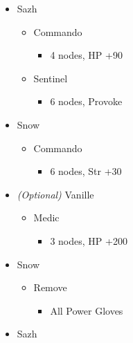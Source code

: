 	\begin{menu}
		\begin{itemize}
			\crystarium
			\begin{itemize}
				\item Sazh
				      \begin{itemize}
					      \item Commando
					            \begin{itemize}
						            \item 4 nodes, HP +90
					            \end{itemize}
					      \item Sentinel
					            \begin{itemize}
						            \item 6 nodes, Provoke
					            \end{itemize}
				      \end{itemize}
				\item Snow
				      \begin{itemize}
					      \item Commando
					            \begin{itemize}
						            \item 6 nodes, Str +30
					            \end{itemize}
				      \end{itemize}
				\item \textit{(Optional)} Vanille
				      \begin{itemize}
					      \item Medic
					            \begin{itemize}
						            \item 3 nodes, HP +200
					            \end{itemize}
				      \end{itemize}
			\end{itemize}
			\equip
			\begin{itemize}
				\item Snow
				      \begin{itemize}
					      \item Remove
					            \begin{itemize}
						            \item All Power Gloves
					            \end{itemize}
				      \end{itemize}
				\item Sazh
				      \begin{itemize}

\end{itemize}
\end{itemize}
\end{itemize}
\end{menu}
